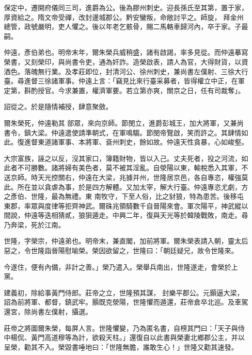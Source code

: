 \begin{pinyinscope}
 保定中，遷開府儀同三司，進爵為公。後為膠州刺史。迎長孫氏至其第，置于家，厚資給之。隋文帝受禪，改封邊城郡公。黔安蠻叛，命敞討平之。師旋，
 拜金州總管，政號嚴明，吏人懼之。後以年老乞骸骨，賜二馬輅車歸河內，卒于家。子最嗣。



 仲遠，彥伯弟也。明帝末年，爾朱榮兵威稍盛，諸有啟謁，率多見從。而仲遠摹寫榮書，又刻榮印，與尚書令吏，通為奸詐。造榮啟表，請人為官，大得財貨，以資酒色。落魄無行業。及孝莊即位，封清河公、徐州刺史，兼尚書左僕射、三徐大行臺。尋進督三徐諸軍事。仲遠上言：「竊見比來行臺采募者，皆得權立中正，在軍定第，斟酌授官。今求兼置，權濟軍要。若立第亦爽，關京之日，任有司裁奪」。



 詔從之。於是隨情補授，肆意聚斂。



 爾朱榮死，仲遠勒其
 部眾，來向京師。節閔立，進爵彭城王，加大將軍，又兼尚書令，鎮大梁。仲遠遣使請準朝式，在軍鳴騶。節閔帝覽啟，笑而許之。其肆情如此。復進督東道諸軍事、本將軍、袞州刺史，餘如故。仲遠天性貪暴，心如峻壑。



 大宗富族，誣之以反，沒其家口，簿籍財物，皆以入己。丈夫死者，投之河流，如此者不可勝數。諸將婦有美色者，莫不被其淫亂。自滎陽以東，輸稅悉入其軍，不送京師。時天光控關右，仲遠在大梁，兆據并州，世隆居京邑，各自專恣，權強莫此。所在並以貪虐為事，於是四方解體。又加太宰，解大行臺。仲遠專恣尤劇，方之彥伯、世隆，最為無禮。東
 南牧守，下至人俗，比之豺狼，特為患苦。後移屯東郡，率眾與度律等拒齊神武。爾硃兆領騎數千自晉陽來會。軍次陽平，神武縱以間說，仲遠等迭相猜貳，狼狽遁走。中興二年，復與天光等於韓陵戰敗，南走。尋乃奔梁，死於江南。



 世隆，字榮宗，仲遠弟也。明帝末，兼直閣，加前將軍。爾朱榮表請入朝，靈太后惡之，令世隆詣晉陽慰喻榮。榮因欲留之，世隆曰：「朝廷疑兄，故令世隆來。



 今遂住，便有內備，非計之善。」榮乃遣入。榮舉兵南出，世隆遂走，會榮於上黨。



 建義初，除給事黃門侍郎。莊帝之立，世隆預其謀，
 封樂平郡公。元顥逼大梁，詔為前將軍、都督，鎮武牢。顥既克滎陽，世隆懼而遁還，莊帝倉卒北巡。及車駕還宮，除尚書左僕射，攝選。



 莊帝之將圖爾朱榮，每屏人言。世隆懼變，乃為匿名書，自榜其門曰：「天子與侍中楊侃、黃門高道穆等為計，欲殺天柱。」還復自以此書與榮妻北鄉郡公主，并以呈榮，勸其不入。榮毀書唾地曰：「世隆無膽，誰敢生心！」世隆又勸其速發。




\end{pinyinscope}

